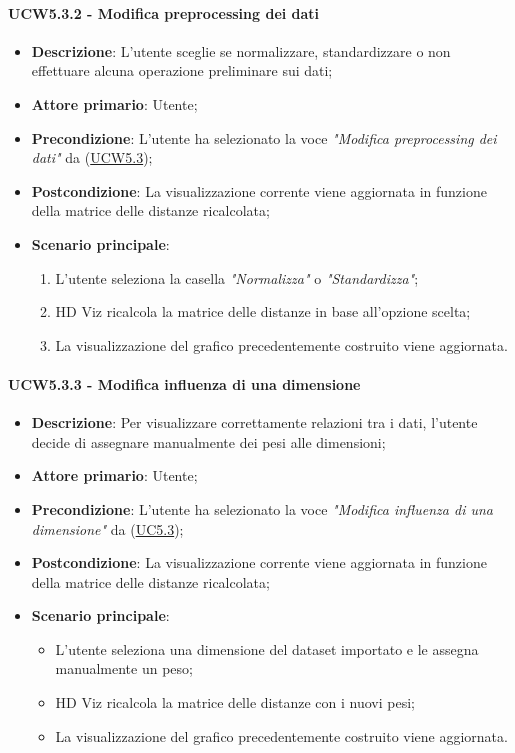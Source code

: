 \paragraph{UCW5.3.2 - Modifica preprocessing dei dati}
\label{par:ucw5.3.2}
\begin{itemize}
    \item \textbf{Descrizione}: L’utente sceglie se normalizzare, standardizzare o non effettuare alcuna operazione preliminare sui dati;

    \item \textbf{Attore primario}: Utente;
    \item \textbf{Precondizione}: L'utente ha selezionato la voce \emph{"Modifica preprocessing dei dati"} da (\hyperref[ssub:ucw5.3]{UCW5.3});
    \item \textbf{Postcondizione}: La visualizzazione corrente viene aggiornata in funzione della matrice delle distanze ricalcolata;
    \item \textbf{Scenario principale}:
          \begin{enumerate}
              \item L'utente seleziona la casella \emph{"Normalizza"} o \emph{"Standardizza"};
              \item HD Viz ricalcola la matrice delle distanze in base all'opzione scelta;
              \item La visualizzazione del grafico precedentemente costruito viene aggiornata.
          \end{enumerate}
\end{itemize}

\paragraph{UCW5.3.3 - Modifica influenza di una dimensione}
\label{par:ucw5.3.3}
\begin{itemize}
    \item \textbf{Descrizione}: Per visualizzare correttamente relazioni tra i dati,
          l’utente decide di assegnare manualmente dei pesi alle dimensioni;

    \item \textbf{Attore primario}: Utente;
    \item \textbf{Precondizione}: L'utente ha selezionato la voce \emph{"Modifica influenza di una dimensione"} da (\hyperref[ssub:uc5.3]{UC5.3});

    \item \textbf{Postcondizione}: La visualizzazione corrente viene aggiornata in funzione della matrice delle distanze ricalcolata;
    \item \textbf{Scenario principale}:
          \begin{itemize}
              \item L’utente seleziona una dimensione del dataset importato e le assegna manualmente un peso;
              \item HD Viz ricalcola la matrice delle distanze con i nuovi pesi;
              \item La visualizzazione del grafico precedentemente costruito viene aggiornata.
          \end{itemize}
\end{itemize}

